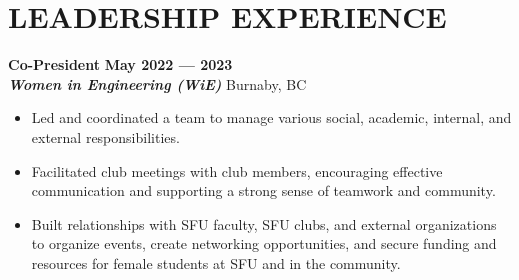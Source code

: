 \documentclass[letterpaper,11pt]{article}
\newcommand{\Item} [1] {
    \item\small{{#1 \vspace{-2pt}}}
}
\newcommand{\employer} [5] {
    {\textbf{#3} \hfill \textbf{#4 --- #5}\\ \textbf{\emph{#1}} \hfill #2\\}
}
\newcommand{\workItemListStart} [0] {
    \vspace{-1pt}
    \begin{itemize}[topsep=0pt,itemsep=-2pt]
}
\newcommand{\workItemListEnd} [0] {
    \end{itemize}
    \vspace{1pt}
}
\begin{document}
    \section{LEADERSHIP EXPERIENCE}
    \employer{Women in Engineering (WiE)}{Burnaby, BC}{Co-President}{May 2022}{2023}
    \workItemListStart{}
        \Item{Led and coordinated a team to manage various social, academic, internal, and external responsibilities.}
        \Item{Facilitated club meetings with club members, encouraging effective communication and supporting a strong sense of teamwork and community.}
        \Item{Built relationships with SFU faculty, SFU clubs, and external organizations to organize events, create networking opportunities, and secure funding and resources for female students at SFU and in the community.}
    \workItemListEnd{}

\end{document}
